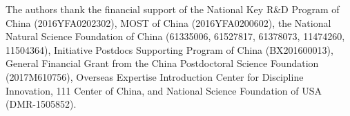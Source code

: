\documentclass[journal=jacsat,manuscript=article]{achemso}
\begin{document}
\begin{acknowledgement}

The authors thank the financial support of the National Key R\&D Program of China
(2016YFA0202302), MOST of China (2016YFA0200602), the National Natural Science Foundation of China (61335006, 61527817, 61378073, 11474260, 11504364), Initiative Postdocs Supporting Program of China (BX201600013), General Financial Grant from the China Postdoctoral Science Foundation (2017M610756), Overseas Expertise Introduction Center for Discipline Innovation, 111 Center of China, and National Science Foundation of USA (DMR-1505852). 

\end{acknowledgement}






\end{document}
